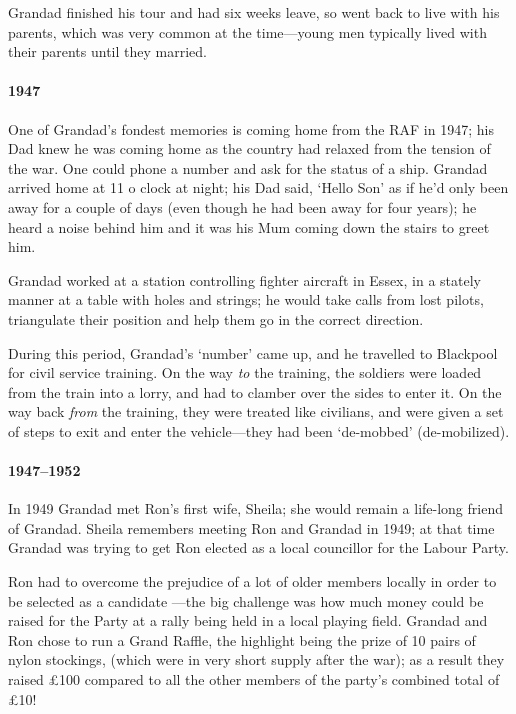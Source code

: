 Grandad finished his tour and had six weeks leave, so went back to live with his parents, which was
very common at the time---young men typically lived with their parents until they married.

\paragraph{1947} One of Grandad's fondest memories is coming home from the RAF in 1947; his Dad knew
he was coming home  as the country had relaxed from the tension of the war.
One could phone a number and ask for the status of a ship. Grandad arrived home at
11 o clock at night; his Dad said, `Hello Son' as if he'd only been away for
a couple of days (even though he had been away for four years); he heard a noise
behind him and it was his Mum coming down the stairs to greet him.

Grandad worked at a station controlling fighter aircraft in Essex, in a stately manner at a table
with holes and strings; he would take calls from lost pilots, triangulate their position
and help them go in the correct direction.

During this period, Grandad's `number' came up, and he travelled to Blackpool for
civil service training. On the way \emph{to} the training, the soldiers were loaded from
the train into a lorry, and had to clamber over the sides to enter it. On the
way back \emph{from} the training, they were treated like civilians, and were
given a set of steps to exit and enter the vehicle---they had been `de-mobbed' (de-mobilized).

\paragraph{1947--1952} In 1949 Grandad met Ron's first wife, Sheila; she would
remain a life-long friend of Grandad. Sheila remembers meeting Ron and Grandad
in 1949; at that time Grandad was trying to get Ron elected as a local councillor
for the Labour Party.

Ron had to overcome the
prejudice of a lot of older members locally in order to be selected as a candidate ---the big challenge was
how much money could be raised for the Party at a rally being held
in a local playing field.
Grandad and Ron chose to run a Grand Raffle, the highlight being the
prize of 10 pairs of nylon stockings, (which were in very short supply
after the war); as a result they
raised \pounds100 compared to all the other members of the party's combined
total of \pounds10!

